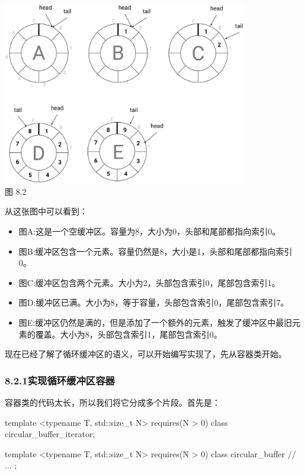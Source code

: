 \begin{center}
\includegraphics[width=0.8\textwidth]{images/2.png}\\
图 8.2
\end{center}

从这张图中可以看到：

\begin{itemize}
\item
图A:这是一个空缓冲区。容量为8，大小为0，头部和尾部都指向索引0。

\item
图B:缓冲区包含一个元素。容量仍然是8，大小是1，头部和尾部都指向索引0。

\item
图C:缓冲区包含两个元素。大小为2，头部包含索引0，尾部包含索引1。

\item
图D:缓冲区已满。大小为8，等于容量，头部包含索引0，尾部包含索引7。

\item
图E:缓冲区仍然是满的，但是添加了一个额外的元素，触发了缓冲区中最旧元素的覆盖。大小为8，头部包含索引1，尾部包含索引0。
\end{itemize}

现在已经了解了循环缓冲区的语义，可以开始编写实现了，先从容器类开始。

\subsubsection{8.2.1\hspace{0.2cm}实现循环缓冲区容器}

容器类的代码太长，所以我们将它分成多个片段。首先是：

\begin{cpp}
template <typename T, std::size_t N>
	requires(N > 0)
class circular_buffer_iterator;

template <typename T, std::size_t N>
	requires(N > 0)
class circular_buffer
{
	// ...
};
\end{cpp}

